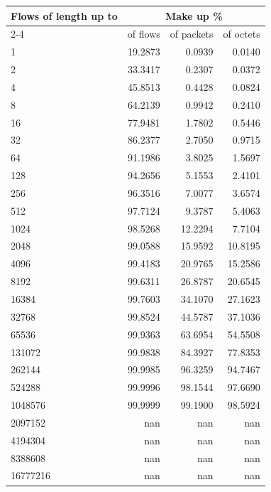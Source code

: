 \begin{tabular}{@{}lrrr@{}}
\toprule
\textbf{Flows of length up to} & \multicolumn{3}{c}{\textbf{Make up \%}} \\
\cmidrule(lr){2-4}
\multicolumn{1}{c}{(packets)} & of flows & of packets & of octets \\
\midrule
1 & 19.2873 & 0.0939 & 0.0140 \\
2 & 33.3417 & 0.2307 & 0.0372 \\
4 & 45.8513 & 0.4428 & 0.0824 \\
8 & 64.2139 & 0.9942 & 0.2410 \\
16 & 77.9481 & 1.7802 & 0.5446 \\
32 & 86.2377 & 2.7050 & 0.9715 \\
64 & 91.1986 & 3.8025 & 1.5697 \\
128 & 94.2656 & 5.1553 & 2.4101 \\
256 & 96.3516 & 7.0077 & 3.6574 \\
512 & 97.7124 & 9.3787 & 5.4063 \\
1024 & 98.5268 & 12.2294 & 7.7104 \\
2048 & 99.0588 & 15.9592 & 10.8195 \\
4096 & 99.4183 & 20.9765 & 15.2586 \\
8192 & 99.6311 & 26.8787 & 20.6545 \\
16384 & 99.7603 & 34.1070 & 27.1623 \\
32768 & 99.8524 & 44.5787 & 37.1036 \\
65536 & 99.9363 & 63.6954 & 54.5508 \\
131072 & 99.9838 & 84.3927 & 77.8353 \\
262144 & 99.9985 & 96.3259 & 94.7467 \\
524288 & 99.9996 & 98.1544 & 97.6690 \\
1048576 & 99.9999 & 99.1900 & 98.5924 \\
2097152 & nan & nan & nan \\
4194304 & nan & nan & nan \\
8388608 & nan & nan & nan \\
16777216 & nan & nan & nan \\
\bottomrule
\end{tabular}


